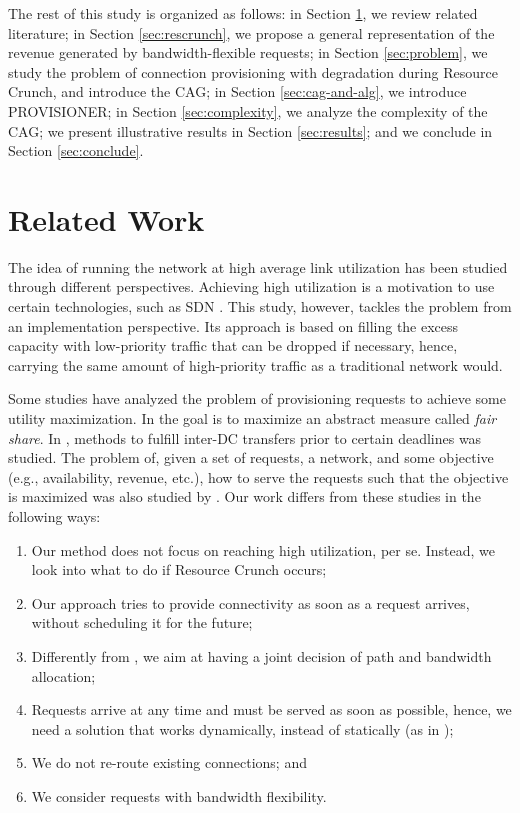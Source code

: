 \documentclass[journal]{IEEEtran}
\begin{document}
The rest of this study is organized as follows: in Section \ref{sec:related}, we review related literature; in Section \ref{sec:rescrunch}, we propose a general representation of the revenue generated by bandwidth-flexible requests; in Section \ref{sec:problem}, we study the problem of connection provisioning with degradation during Resource Crunch, and introduce the CAG; in Section \ref{sec:cag-and-alg}, we introduce PROVISIONER; in Section \ref{sec:complexity}, we analyze the complexity of the CAG; we present illustrative results in Section \ref{sec:results}; and we conclude in Section \ref{sec:conclude}.

\section{Related Work} \label{sec:related}

The idea of running the network at high average link utilization has been studied through different perspectives. Achieving high utilization is a motivation to use certain technologies, such as SDN \cite{hong2013achieving}. This study, however, tackles the problem from an implementation perspective. Its approach is based on filling the excess capacity with low-priority traffic that can be dropped if necessary, hence, carrying the same amount of high-priority traffic as a traditional network would.

Some studies have analyzed the problem of provisioning requests to achieve some utility maximization. In \cite{Kumar:2015:BFH:2785956.2787478, jain2013b4} the goal is to maximize an abstract measure called \textit{fair share}. In \cite {7006776, Zhang:2017:GDI:3068707.3068746}, methods to fulfill inter-DC transfers prior to certain deadlines was studied. The problem of, given a set of requests, a network, and some objective (e.g., availability, revenue, etc.), how to serve the requests such that the objective is maximized was also studied by \cite{chiang2007layering, lin2006utility}. Our work differs from these studies in the following ways:
\begin{enumerate}
 \item Our method does not focus on reaching high utilization, per se. Instead, we look into what to do if Resource Crunch occurs;
 \item Our approach tries to provide connectivity as soon as a request arrives, without scheduling it for the future;
 \item Differently from \cite{Kumar:2015:BFH:2785956.2787478, jain2013b4}, we aim at having a joint decision of path and bandwidth allocation;
\item Requests arrive at any time and must be served as soon as possible, hence, we need a solution that works dynamically, instead of statically (as in \cite{chiang2007layering, lin2006utility});
 \item We do not re-route existing connections; and
 \item We consider requests with bandwidth flexibility.
\end{enumerate}
\end{document}

